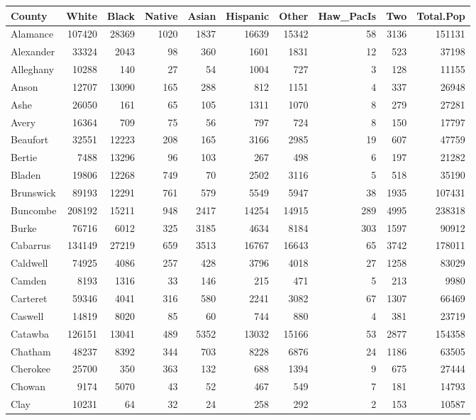 \documentclass[12pt,]{article}
\begin{document}
\begin{tabular}{lrrrrrrrrr}
\toprule
County & White & Black & Native & Asian & Hispanic & Other & Haw\_PacIs & Two & Total.Pop\\
\midrule
Alamance & 107420 & 28369 & 1020 & 1837 & 16639 & 15342 & 58 & 3136 & 151131\\
Alexander & 33324 & 2043 & 98 & 360 & 1601 & 1831 & 12 & 523 & 37198\\
Alleghany & 10288 & 140 & 27 & 54 & 1004 & 727 & 3 & 128 & 11155\\
Anson & 12707 & 13090 & 165 & 288 & 812 & 1151 & 4 & 337 & 26948\\
Ashe & 26050 & 161 & 65 & 105 & 1311 & 1070 & 8 & 279 & 27281\\
\addlinespace
Avery & 16364 & 709 & 75 & 56 & 797 & 724 & 8 & 150 & 17797\\
Beaufort & 32551 & 12223 & 208 & 165 & 3166 & 2985 & 19 & 607 & 47759\\
Bertie & 7488 & 13296 & 96 & 103 & 267 & 498 & 6 & 197 & 21282\\
Bladen & 19806 & 12268 & 749 & 70 & 2502 & 3116 & 5 & 518 & 35190\\
Brunswick & 89193 & 12291 & 761 & 579 & 5549 & 5947 & 38 & 1935 & 107431\\
\addlinespace
Buncombe & 208192 & 15211 & 948 & 2417 & 14254 & 14915 & 289 & 4995 & 238318\\
Burke & 76716 & 6012 & 325 & 3185 & 4634 & 8184 & 303 & 1597 & 90912\\
Cabarrus & 134149 & 27219 & 659 & 3513 & 16767 & 16643 & 65 & 3742 & 178011\\
Caldwell & 74925 & 4086 & 257 & 428 & 3796 & 4018 & 27 & 1258 & 83029\\
Camden & 8193 & 1316 & 33 & 146 & 215 & 471 & 5 & 213 & 9980\\
\addlinespace
Carteret & 59346 & 4041 & 316 & 580 & 2241 & 3082 & 67 & 1307 & 66469\\
Caswell & 14819 & 8020 & 85 & 60 & 744 & 880 & 4 & 381 & 23719\\
Catawba & 126151 & 13041 & 489 & 5352 & 13032 & 15166 & 53 & 2877 & 154358\\
Chatham & 48237 & 8392 & 344 & 703 & 8228 & 6876 & 24 & 1186 & 63505\\
Cherokee & 25700 & 350 & 363 & 132 & 688 & 1394 & 9 & 675 & 27444\\
\addlinespace
Chowan & 9174 & 5070 & 43 & 52 & 467 & 549 & 7 & 181 & 14793\\
Clay & 10231 & 64 & 32 & 24 & 258 & 292 & 2 & 153 & 10587\\

\end{tabular}
\end{document}
